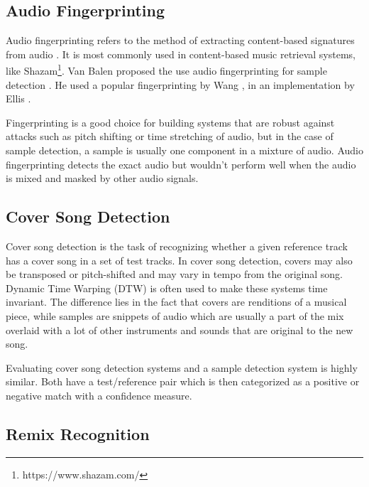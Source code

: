 \documentclass{article}
\begin{document}
\subsection{Audio Fingerprinting}

Audio fingerprinting refers to the method of extracting content-based signatures from audio \cite{cano2005review}. It is most commonly used in content-based music retrieval systems, like Shazam\footnote{https://www.shazam.com/}.
Van Balen proposed the use audio fingerprinting for sample detection \cite{van2011automatic}. He used a popular fingerprinting by Wang \cite{wang2003industrial}, in an implementation by Ellis \cite{ellisfinger}. 

Fingerprinting is a good choice for building systems that are robust against attacks such as pitch shifting or time stretching of audio, but in the case of sample detection, a sample is usually one component in a mixture of audio. Audio fingerprinting detects the exact audio but wouldn't perform well when the audio is mixed and masked by other audio signals.

\subsection{Cover Song Detection}
Cover song detection is the task of recognizing whether a given reference track has a cover song in a set of test tracks\cite{Ellis2007Cover,serracover,bertin2011large}.
In cover song detection, covers may also be transposed or pitch-shifted and may vary in tempo from the original song. Dynamic Time Warping (DTW) \cite{berndt1994using} is often used to make these systems time invariant. The difference lies in the fact that covers are renditions of a musical piece, while samples are snippets of audio which are usually a part of the mix overlaid with a lot of other instruments and sounds that are original to the new song.

Evaluating cover song detection systems and a sample detection system is highly similar. Both have a test/reference pair which is then categorized as a positive or negative match with a confidence measure. 
\subsection{Remix Recognition}
\end{document}
